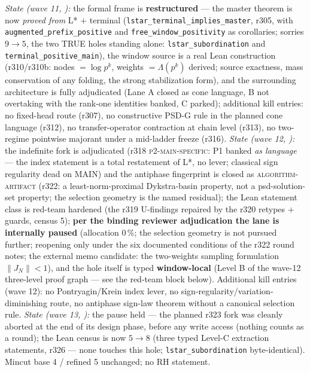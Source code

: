 {\emph{State (wave 11,
):} the formal frame is
\textbf{restructured} --- the master theorem is now \emph{proved
from} L* $+$ terminal
(\texttt{lstar\_terminal\_implies\_master}, r305, with
\texttt{augmented\_prefix\_positive} and
\texttt{free\_window\_positivity} as corollaries; sorries $9 \to
5$, the two TRUE holes standing alone:
\texttt{lstar\_subordination} and
\texttt{terminal\_positive\_main}), the window source is a real
Lean construction (r310/r310b: nodes $= \log p^k$, weights $=
\Lambda(p^k)$ derived; source exactness, mass conservation of any
folding, the strong stabilization form), and the surrounding
architecture is fully adjudicated (Lane A closed as cone language,
B not overtaking with the rank-one identities banked, C parked);
additional kill entries: no fixed-head route (r307), no
constructive PSD-G rule in the planned cone language (r312), no
transfer-operator contraction at chain level (r313), no two-regime
pointwise majorant under a mid-ladder freeze (r316).
\emph{State (wave 12, ):} the
indefinite fork is adjudicated (r318 \textsc{p2-main-specific}: P1
banked \emph{as language} --- the index statement is a total
restatement of L*, no lever; classical sign regularity dead on
MAIN) and the antiphase fingerprint is closed as
\textsc{algorithm-artifact} (r322: a least-norm-proximal
Dykstra-basin property, not a psd-solution-set property; the
selection geometry is the named residual); the Lean statement
class is red-team hardened (the r319 U-findings repaired by the
r320 retypes $+$ guards, census 5); \textbf{per the binding
reviewer adjudication the lane is internally paused} (allocation
0\,\%; the selection geometry is not pursued further; reopening
only under the six documented conditions of the r322 round notes;
the external memo candidate: the two-weights sampling formulation
$\lVert J_N\rVert < 1$), and the hole itself is typed
\textbf{window-local} (Level B of the wave-12 three-level proof
graph --- see the red-team block below).  Additional kill entries
(wave 12): no Pontryagin/Krein index lever, no
sign-regularity/variation-diminishing route, no antiphase sign-law
theorem without a canonical selection rule.
\emph{State (wave 13, ):}
the pause held --- the planned r323 fork was cleanly aborted at the
end of its design phase, before any write access (nothing counts as
a round); the Lean census is now $5 \to 8$ (three typed Level-C
extraction statements, r326 --- none touches this hole;
\texttt{lstar\_subordination} byte-identical).  Mincut
base 4 / refined 5 unchanged; no RH statement.\par}


